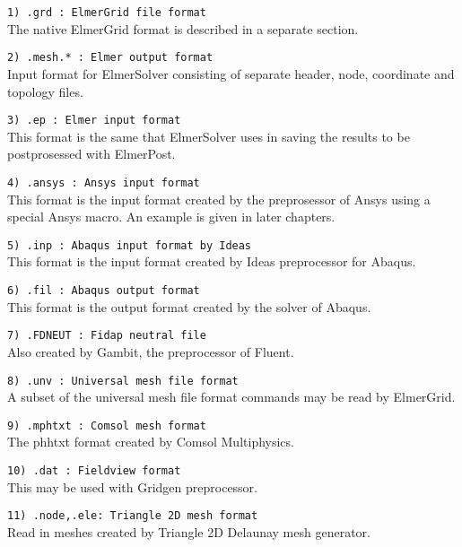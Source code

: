 \begin{description}
\item \texttt{1)  .grd      : ElmerGrid file format} \\
The native ElmerGrid format is  described in a separate section.

\item \texttt{2)  .mesh.*  : Elmer output format} \\
Input format for ElmerSolver consisting of separate header,
node, coordinate and topology files.

\item \texttt{3)  .ep      : Elmer input format} \\
This format is the same that
ElmerSolver uses in saving the results to be 
postprosessed with ElmerPost. 

\item \texttt{4)  .ansys    : Ansys input format} \\
This format is the input format 
created by the preprosessor of Ansys using a special
Ansys macro.
An example is given in later chapters.

\item \texttt{5)  .inp    : Abaqus input format by Ideas} \\
This format is the input format 
created by Ideas preprocessor for Abaqus.

\item \texttt{6)  .fil    : Abaqus output format} \\
This format is the output format 
created by the solver of Abaqus.

\item \texttt{7)  .FDNEUT  : Fidap neutral file} \\
Also created by Gambit, the preprocessor of Fluent.

\item \texttt{8) .unv : Universal mesh file format} \\
A subset of the universal mesh file format commands may be read by ElmerGrid.

\item \texttt{9)  .mphtxt   : Comsol mesh format} \\
The phhtxt format created by Comsol Multiphysics. 

\item \texttt{10)  .dat      : Fieldview format} \\
This may be used with Gridgen preprocessor.

\item \texttt{11) .node,.ele: Triangle 2D mesh format} \\
Read in meshes created by Triangle 2D Delaunay mesh generator.


\end{description}
